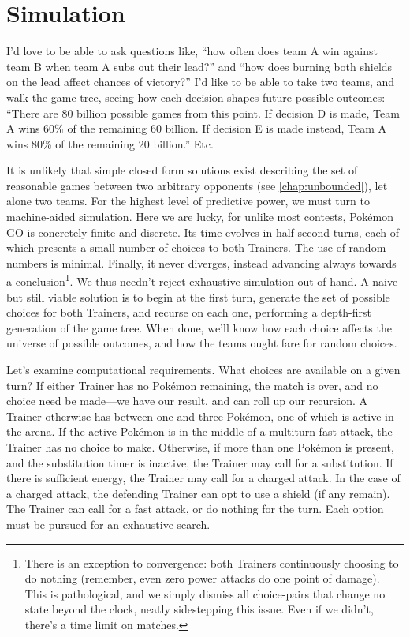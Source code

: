\chapter{Simulation}
\label{chap:simul}
I'd love to be able to ask questions like, ``how often does team A win against
  team B when team A subs out their lead?''
  and ``how does burning both shields on the lead affect chances of victory?''
I'd like to be able to take two teams, and walk the game tree, seeing how
  each decision shapes future possible outcomes: ``There are 80 billion
  possible games from this point. If decision D is made, Team A
  wins 60\% of the remaining 60 billion. If decision E is made instead,
  Team A wins 80\% of the remaining 20 billion.'' Etc.

It is unlikely that simple closed form solutions exist describing
 the set of reasonable games between two arbitrary opponents (see \autoref{chap:unbounded}),
 let alone two teams.
For the highest level of predictive power, we must turn to machine-aided simulation.
Here we are lucky, for unlike most contests, Pokémon GO is concretely finite and discrete.
Its time evolves in half-second turns, each of which presents a small number of choices
  to both Trainers.
The use of random numbers is minimal.
Finally, it never diverges, instead advancing always towards a conclusion\footnote{There
  is an exception to convergence: both Trainers continuously choosing to do nothing (remember,
  even zero power attacks do one point of damage). This is pathological, and we
  simply dismiss all choice-pairs that change no state beyond the clock, neatly sidestepping this issue.
  Even if we didn't, there's a time limit on matches.}.
We thus needn't reject exhaustive simulation out of hand.
A naive but still viable solution is to begin at the first turn, generate the set
  of possible choices for both Trainers, and recurse on each one, performing
  a depth-first generation of the game tree.
When done, we'll know how each choice affects the universe of possible outcomes,
  and how the teams ought fare for random choices.

Let's examine computational requirements.
What choices are available on a given turn?
If either Trainer has no Pokémon remaining, the match is over, and no choice
  need be made---we have our result, and can roll up our recursion.
A Trainer otherwise has between one and three Pokémon, one of which is active
  in the arena.
If the active Pokémon is in the middle of a multiturn fast attack, the
  Trainer has no choice to make.
Otherwise, if more than one Pokémon is present, and the substitution timer is
  inactive, the Trainer may call for a substitution.
If there is sufficient energy, the Trainer may call for a charged attack.
In the case of a charged attack, the defending Trainer can opt to use a shield (if any remain).
The Trainer can call for a fast attack, or do nothing for the turn.
Each option must be pursued for an exhaustive search.

